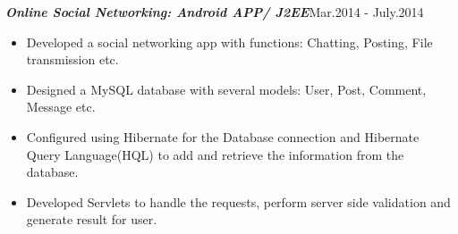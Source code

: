 \documentclass[margin,line]{res}
\begin{document}
\begin{resume}
\begin{itemize}
            \end{itemize}
            
                        {\sl \textbf{Online Social Networking: Android APP/ J2EE}}\hfill Mar.2014 - July.2014 \\[1mm]
            \vspace{-5mm}
            \begin{itemize}
	\item Developed a social networking app with functions: Chatting, Posting, File transmission etc.
	\item Designed a MySQL database with several models: User, Post, Comment,  Message etc.
	\item Configured using Hibernate for the Database connection and Hibernate Query Language(HQL) to add and retrieve the information from the database. 
	\item Developed Servlets to handle the requests, perform server side validation and generate result for user. 

            \end{itemize}
\end{resume}
\end{document}
